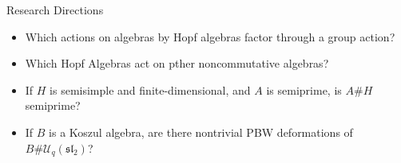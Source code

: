 \documentclass{beamer}
\newcommand\1{_{(1)}}
\newcommand\2{_{(2)}}
\begin{document}
\begin{frame}{Research Directions}
    \begin{itemize}
    \setlength{\itemsep}{2ex}
        \item<1-> Which actions on algebras by Hopf algebras factor through a group action?
        \item<2-> Which Hopf Algebras act on pther noncommutative algebras?
        \item<3-> If $H$ is semisimple and finite-dimensional, and $A$ is semiprime, is $A\#H$ semiprime?
        \item<4-> If $B$ is a Koszul algebra, are there nontrivial PBW deformations of $B\# \mathcal{U}_q(\mathfrak{sl_2})$?
    \end{itemize}
\end{frame}
\end{document}
